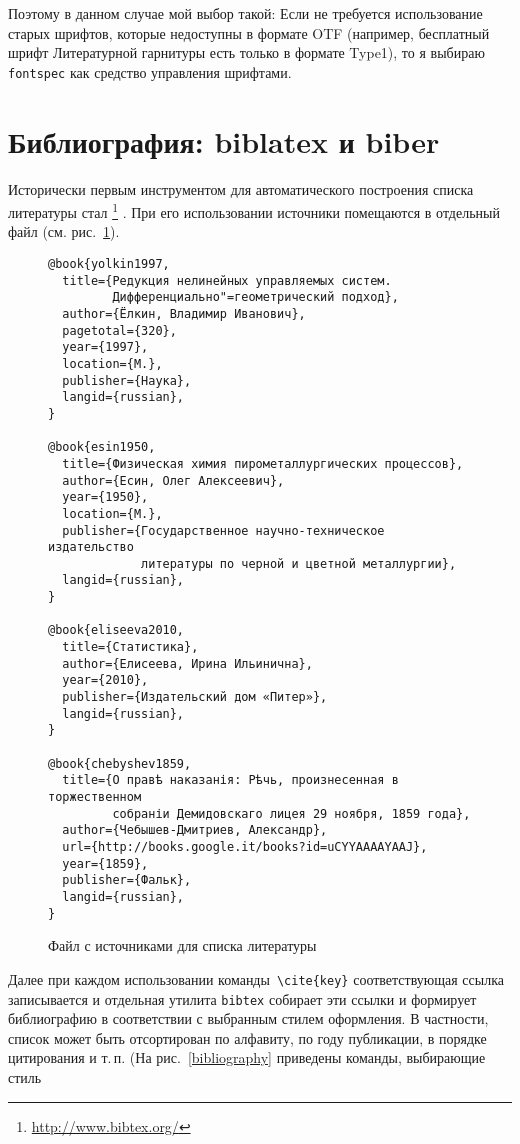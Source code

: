 \documentclass[a4paper,12pt]{article}
\newcommand\foothref[2]{%
  \href{#1}{#2}\footnote{\url{#1}}%
}
\newcommand\package[1]{\texttt{#1}}
\begin{document}
Поэтому в данном случае мой выбор такой: Если не требуется использование
старых шрифтов, которые недоступны в формате OTF (например, бесплатный
шрифт Литературной гарнитуры есть только в формате Type1), то я выбираю
\package{fontspec} как средство управления шрифтами.

\section{Библиография: biblatex и biber}
Исторически первым инструментом для автоматического построения
списка литературы стал \foothref{http://www.bibtex.org/}{\BibTeX}. При его
использовании источники
помещаются в отдельный файл (см. рис.~\ref{bibfile}).
\begin{figure}[tp]
\begin{tcolorbox}
\footnotesize
\begin{verbatim}
@book{yolkin1997,
  title={Редукция нелинейных управляемых систем.
         Дифференциально"=геометрический подход},
  author={Ёлкин, Владимир Иванович},
  pagetotal={320},
  year={1997},
  location={M.},
  publisher={Наука},
  langid={russian},
}

@book{esin1950,
  title={Физическая химия пирометаллургических процессов},
  author={Есин, Олег Алексеевич},
  year={1950},
  location={M.},
  publisher={Государственное научно-техническое издательство
             литературы по черной и цветной металлургии},
  langid={russian},
}

@book{eliseeva2010,
  title={Статистика},
  author={Елисеева, Ирина Ильинична},
  year={2010},
  publisher={Издательский дом «Питер»},
  langid={russian},
}

@book{chebyshev1859,
  title={О правѣ наказанія: Рѣчь, произнесенная в торжественном
         собраніи Демидовскаго лицея 29 ноября, 1859 года},
  author={Чебышев-Дмитриев, Александр},
  url={http://books.google.it/books?id=uCYYAAAAYAAJ},
  year={1859},
  publisher={Фальк},
  langid={russian},
}
\end{verbatim}
\end{tcolorbox}
\caption{Файл с источниками для списка литературы}\label{bibfile}
\end{figure}
Далее при каждом использовании команды~\verb|\cite{key}| соответствующая
ссылка записывается и отдельная утилита \package{bibtex} собирает эти
ссылки и формирует библиографию в соответствии с выбранным стилем оформления.
В частности, список может быть отсортирован по алфавиту, по году
публикации, в порядке цитирования и т.\,п.
(На рис.~\ref{bibliography} приведены команды, выбирающие стиль
\end{document}
